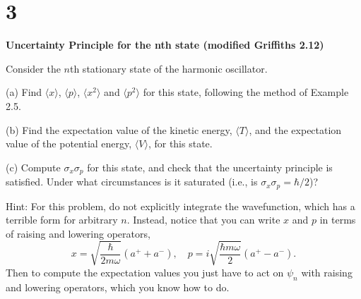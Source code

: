 \documentclass{article}
\begin{document}
\newpage

\section*{3}
\begin{ques}\label{q3}
\textbf{Uncertainty Principle for the nth state (modified Griffiths 2.12)}

Consider the $n$th stationary state of the harmonic oscillator.

(a) Find $\langle x \rangle$, $\langle p \rangle$, $\langle x^2 \rangle$ and $\langle p^2 \rangle$ for this state, following the method of Example 2.5.

(b) Find the expectation value of the kinetic energy, $\langle T \rangle$, and the expectation value of
the potential energy, $\langle V \rangle$, for this state.

(c) Compute $\sigma_x \sigma_p$ for this state, and check that the uncertainty principle is satisfied.
Under what circumstances is it saturated (i.e., is $\sigma_x \sigma_p = \hbar/2$)?

Hint: For this problem, do not explicitly integrate the wavefunction, which has a terrible
form for arbitrary $n$. Instead, notice that you can write $x$ and $p$ in terms of raising and
lowering operators,
\[
x = \sqrt{\frac{\hbar}{2m\omega}} (a^+ + a^-), \quad
p = i\sqrt{\frac{\hbar m\omega}{2}} (a^+ - a^-).
\]
Then to compute the expectation values you just have to act on $\psi_n$ with raising and
lowering operators, which you know how to do.
\end{ques}
\end{document}
